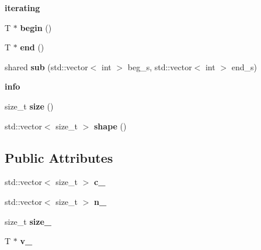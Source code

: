 \begin{Indent}{\bf iterating}\par
{\em \label{_amgrpc920236de44765917757f8b46bb8ccda}
 }\begin{DoxyCompactItemize}
\item 
\hypertarget{class____array_a9e073ed33e0fad10acbbb001af3c10b1}{
T $\ast$ {\bfseries begin} ()}
\label{class____array_a9e073ed33e0fad10acbbb001af3c10b1}

\item 
\hypertarget{class____array_a0e7f0ce953b4d180a940c14e34b503db}{
T $\ast$ {\bfseries end} ()}
\label{class____array_a0e7f0ce953b4d180a940c14e34b503db}

\item 
\hypertarget{class____array_a00efa91c7d776a4afb2d1334a0d05b83}{
shared {\bfseries sub} (std::vector$<$ int $>$ beg\_\-s, std::vector$<$ int $>$ end\_\-s)}
\label{class____array_a00efa91c7d776a4afb2d1334a0d05b83}

\end{DoxyCompactItemize}
\end{Indent}
\begin{Indent}{\bf info}\par
{\em \label{_amgrpcaf9b6b99962bf5c2264824231d7a40c}
 }\begin{DoxyCompactItemize}
\item 
\hypertarget{class____array_abbc3e2f4041747fdb3de9b224db7cb1e}{
size\_\-t {\bfseries size} ()}
\label{class____array_abbc3e2f4041747fdb3de9b224db7cb1e}

\item 
\hypertarget{class____array_a0339a0c0f5a858f98bc8c8a3792c73ed}{
std::vector$<$ size\_\-t $>$ {\bfseries shape} ()}
\label{class____array_a0339a0c0f5a858f98bc8c8a3792c73ed}

\end{DoxyCompactItemize}
\end{Indent}
\subsection*{Public Attributes}
\begin{DoxyCompactItemize}
\item 
\hypertarget{class____array_a3f8bd6c9e9554f032fc9ce51037a9068}{
std::vector$<$ size\_\-t $>$ {\bfseries c\_\-}}
\label{class____array_a3f8bd6c9e9554f032fc9ce51037a9068}

\item 
\hypertarget{class____array_aeeea561b072cbbbcbbf5385fc010ad9c}{
std::vector$<$ size\_\-t $>$ {\bfseries n\_\-}}
\label{class____array_aeeea561b072cbbbcbbf5385fc010ad9c}

\item 
\hypertarget{class____array_a9e84ea9904c281c73d38730bf1c63c6f}{
size\_\-t {\bfseries size\_\-}}
\label{class____array_a9e84ea9904c281c73d38730bf1c63c6f}

\item 
\hypertarget{class____array_acd1bdf7fd0d7c1d9888ec5ab746e4472}{
T $\ast$ {\bfseries v\_\-}}
\label{class____array_acd1bdf7fd0d7c1d9888ec5ab746e4472}

\end{DoxyCompactItemize}
